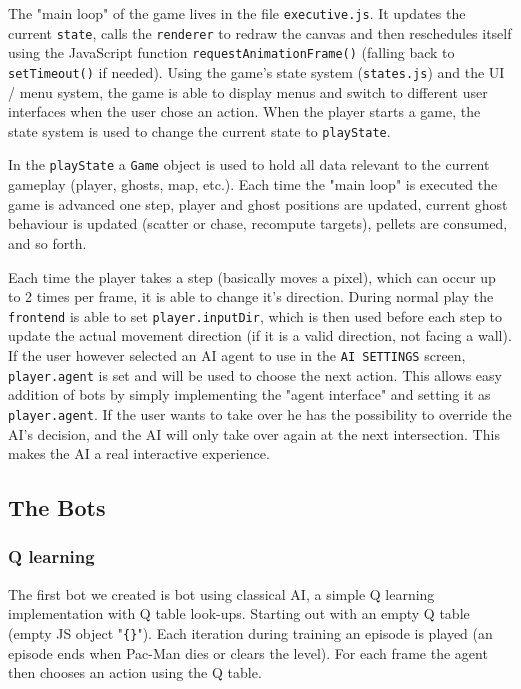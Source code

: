\documentclass[10pt, letterpaper]{article}
\begin{document}
            The "main loop" of the game lives in the file \texttt{executive.js}. It updates the current \texttt{state}, calls the \texttt{renderer} to redraw the canvas and then reschedules itself using the JavaScript function \texttt{requestAnimationFrame()} (falling back to \texttt{setTimeout()} if needed). Using the game's state system (\texttt{states.js}) and the UI / menu system, the game is able to display menus and switch to different user interfaces when the user chose an action. When the player starts a game, the state system is used to change the current state to \texttt{playState}.
            
            In the \texttt{playState} a \texttt{Game} object is used to hold all data relevant to the current gameplay (player, ghosts, map, etc.). Each time the "main loop" is executed the game is advanced one step, player and ghost positions are updated, current ghost behaviour is updated (scatter or chase, recompute targets), pellets are consumed, and so forth.
            
            Each time the player takes a step (basically moves a pixel), which can occur up to 2 times per frame, it is able to change it's direction. During normal play the \texttt{frontend} is able to set \texttt{player.inputDir}, which is then used before each step to update the actual movement direction (if it is a valid direction, not facing a wall). If the user however selected an AI agent to use in the \texttt{AI SETTINGS} screen, \texttt{player.agent} is set and will be used to choose the next action. This allows easy addition of bots by simply implementing the "agent interface" and setting it as \texttt{player.agent}. If the user wants to take over he has the possibility to override the AI's decision, and the AI will only take over again at the next intersection. This makes the AI a real interactive experience.
        
        \subsection{The Bots}
            \subsubsection*{Q learning}
                The first bot we created is bot using classical AI, a simple Q learning implementation with Q table look-ups. Starting out with an empty Q table (empty JS object "\texttt{\{\}}"). Each iteration during training an episode is played (an episode ends when Pac-Man dies or clears the level). For each frame the agent then chooses an action using the Q table.
                
\end{document}
